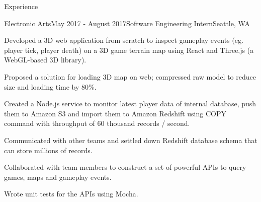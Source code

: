\documentclass{resume} %
\begin{document}
\begin{rSection}{Experience}
\begin{rSubsection}{Electronic Arts}{May 2017 - August 2017}{Software Engineering Intern}{Seattle, WA}
\item Developed a 3D web application from scratch to inspect gameplay events (eg. player tick, player death) on a 3D game terrain map using React and Three.js (a WebGL-based 3D library).
\item Proposed a solution for loading 3D map on web; compressed raw model to reduce size and loading time by 80\%.
\item Created a Node.js service to monitor latest player data of internal database, push them to Amazon S3 and import them to Amazon Redshift using COPY command with throughput of 60 thousand records / second.
\item Communicated with other teams and settled down Redshift database schema that can store millions of records.
\item Collaborated with team members to construct a set of powerful APIs to query games, maps and gameplay events.
\item Wrote unit tests for the APIs using Mocha.
\end{rSubsection}




\end{rSection}

\end{document}

